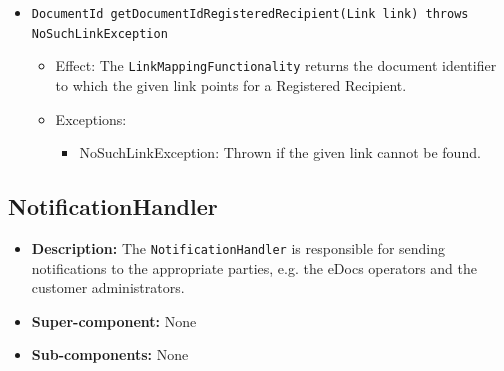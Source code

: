 \documentclass[a4paper,10pt]{article}
\begin{document}
\begin{itemize}
\begin{itemize}
		\item \texttt{DocumentId getDocumentIdRegisteredRecipient(Link link) throws NoSuchLinkException}
		 \begin{itemize}
            \item Effect: The \texttt{LinkMappingFunctionality} returns the document identifier to which the given link points for a Registered Recipient. 
            \item Exceptions: 
            \begin{itemize}
            	\item NoSuchLinkException: Thrown if the given link cannot be found.
            \end{itemize}
		\end{itemize}				
		
		
	\end{itemize}
\end{itemize}

\subsection{NotificationHandler}
\begin{itemize}
    \item \textbf{Description:} The \texttt{NotificationHandler} is responsible for sending notifications to the appropriate parties, e.g. the eDocs operators and the customer administrators.
    \item \textbf{Super-component:} None
    \item \textbf{Sub-components:} None
\end{itemize}
\end{document}
